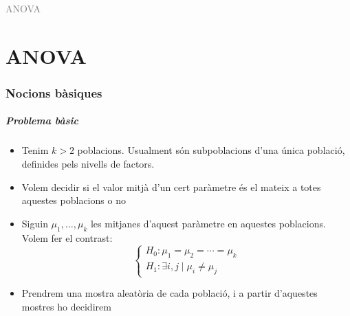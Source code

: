 \documentclass[12pt,t]{beamer}
\title[\red{Matemàtiques III}]{}
\author[]{}
\date{}
\newcommand{\gray}[1]{\textcolor{gray}{#1}}
\theoremstyle{plain}
\theoremstyle{definition}
\begin{document}
\beamertemplatedotitem

\lstset{breaklines=true}
\lstset{basicstyle=\ttfamily}


\begin{frame}
\vfill
\begin{center}
\gray{\LARGE ANOVA}
\end{center}
\vfill
\end{frame}



\part{ANOVA}

\section{Nocions bàsiques}
\begin{frame}
\frametitle{Problema bàsic}
\begin{itemize}
\item Tenim $k>2$ poblacions. Usualment són subpoblacions d'una única població, definides pels nivells de factors.
\medskip

\item Volem decidir si el valor mitjà d'un cert paràmetre és el mateix a totes aquestes poblacions o no
\medskip

\item Siguin $\mu_1,\ldots,\mu_k$ les mitjanes d'aquest paràmetre en aquestes poblacions. Volem fer el contrast:
$$
\left\{
\begin{array}{l}
H_0 : \mu_1 =\mu_2 =\cdots =\mu_k \\
H_1 : \exists i,j \mid  \mu_i \not=\mu_j
\end{array}
\right.
$$

\item Prendrem una mostra aleatòria de cada població, i a partir d'aquestes mostres ho decidirem
\end{itemize}



\end{frame}
\end{document}
